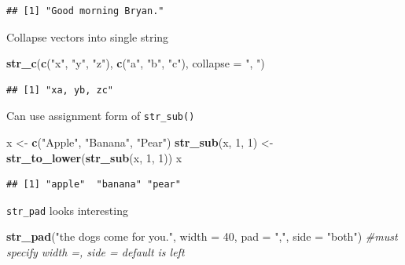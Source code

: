 \documentclass[]{book}
\newenvironment{Shaded}{\begin{snugshade}}{\end{snugshade}}
\newcommand{\CommentTok}[1]{\textcolor[rgb]{0.56,0.35,0.01}{\textit{#1}}}
\newcommand{\DataTypeTok}[1]{\textcolor[rgb]{0.13,0.29,0.53}{#1}}
\newcommand{\DecValTok}[1]{\textcolor[rgb]{0.00,0.00,0.81}{#1}}
\newcommand{\KeywordTok}[1]{\textcolor[rgb]{0.13,0.29,0.53}{\textbf{#1}}}
\newcommand{\NormalTok}[1]{#1}
\newcommand{\StringTok}[1]{\textcolor[rgb]{0.31,0.60,0.02}{#1}}
\theoremstyle{definition}
\theoremstyle{definition}
\theoremstyle{definition}
\theoremstyle{remark}
\begin{document}
\begin{verbatim}
## [1] "Good morning Bryan."
\end{verbatim}

Collapse vectors into single string

\begin{Shaded}
\begin{Highlighting}[]
\KeywordTok{str_c}\NormalTok{(}\KeywordTok{c}\NormalTok{(}\StringTok{"x"}\NormalTok{, }\StringTok{"y"}\NormalTok{, }\StringTok{"z"}\NormalTok{), }\KeywordTok{c}\NormalTok{(}\StringTok{"a"}\NormalTok{, }\StringTok{"b"}\NormalTok{, }\StringTok{"c"}\NormalTok{), }\DataTypeTok{collapse =} \StringTok{", "}\NormalTok{)}
\end{Highlighting}
\end{Shaded}

\begin{verbatim}
## [1] "xa, yb, zc"
\end{verbatim}

Can use assignment form of \texttt{str\_sub()}

\begin{Shaded}
\begin{Highlighting}[]
\NormalTok{x <-}\StringTok{ }\KeywordTok{c}\NormalTok{(}\StringTok{"Apple"}\NormalTok{, }\StringTok{"Banana"}\NormalTok{, }\StringTok{"Pear"}\NormalTok{)}
\KeywordTok{str_sub}\NormalTok{(x, }\DecValTok{1}\NormalTok{, }\DecValTok{1}\NormalTok{) <-}\StringTok{ }\KeywordTok{str_to_lower}\NormalTok{(}\KeywordTok{str_sub}\NormalTok{(x, }\DecValTok{1}\NormalTok{, }\DecValTok{1}\NormalTok{))}
\NormalTok{x}
\end{Highlighting}
\end{Shaded}

\begin{verbatim}
## [1] "apple"  "banana" "pear"
\end{verbatim}

\texttt{str\_pad} looks interesting

\begin{Shaded}
\begin{Highlighting}[]
\KeywordTok{str_pad}\NormalTok{(}\StringTok{"the dogs come for you."}\NormalTok{, }\DataTypeTok{width =} \DecValTok{40}\NormalTok{, }\DataTypeTok{pad =} \StringTok{","}\NormalTok{, }\DataTypeTok{side =} \StringTok{"both"}\NormalTok{) }\CommentTok{#must specify width =, side = default is left}
\end{Highlighting}
\end{Shaded}
\end{document}
